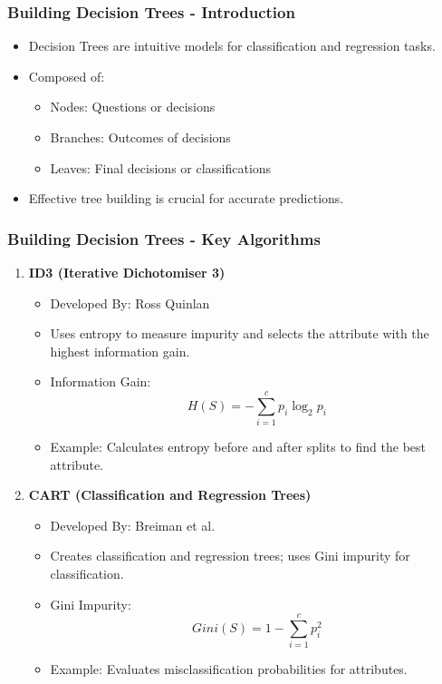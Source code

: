 \documentclass{beamer}
\begin{document}
\begin{frame}[fragile]
    \frametitle{Building Decision Trees - Introduction}
    \begin{itemize}
        \item Decision Trees are intuitive models for classification and regression tasks.
        \item Composed of:
        \begin{itemize}
            \item Nodes: Questions or decisions
            \item Branches: Outcomes of decisions
            \item Leaves: Final decisions or classifications
        \end{itemize}
        \item Effective tree building is crucial for accurate predictions.
    \end{itemize}
\end{frame}

\begin{frame}[fragile]
    \frametitle{Building Decision Trees - Key Algorithms}
    \begin{enumerate}
        \item \textbf{ID3 (Iterative Dichotomiser 3)}
        \begin{itemize}
            \item Developed By: Ross Quinlan
            \item Uses entropy to measure impurity and selects the attribute with the highest information gain.
            \item Information Gain:
            \begin{equation}
              H(S) = -\sum_{i=1}^{c} p_i \log_2 p_i
            \end{equation}
            \item Example: Calculates entropy before and after splits to find the best attribute.
        \end{itemize}
        
        \item \textbf{CART (Classification and Regression Trees)}
        \begin{itemize}
            \item Developed By: Breiman et al.
            \item Creates classification and regression trees; uses Gini impurity for classification.
            \item Gini Impurity:
            \begin{equation}
              Gini(S) = 1 - \sum_{i=1}^{c} p_i^2
            \end{equation}
            \item Example: Evaluates misclassification probabilities for attributes.
        \end{itemize}
    \end{enumerate}
\end{frame}
\end{document}
